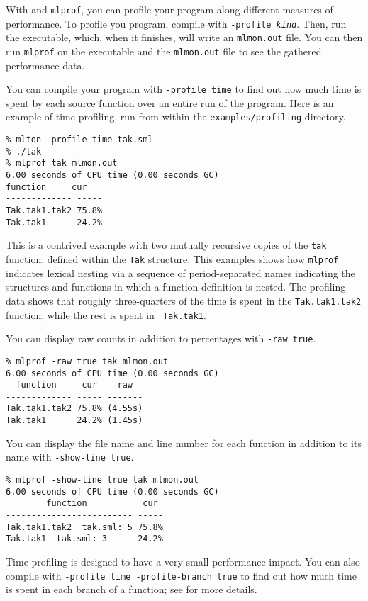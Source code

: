 
With {\mlton} and {\tt mlprof}, you can profile your program along
different measures of performance.  To profile you program, compile
with {\tt -profile {\em kind}}.  Then, run the executable, which, when
it finishes, will write an {\tt mlmon.out} file.  You can then run
{\tt mlprof} on the executable and the {\tt mlmon.out} file to see the
gathered performance data.

%
You can compile your program with {\tt -profile time} to find out how
much time is spent by each source function over an entire run of the
program.  Here is an example of time profiling, run from within the
{\tt examples/profiling} directory.
\begin{verbatim}
% mlton -profile time tak.sml
% ./tak
% mlprof tak mlmon.out
6.00 seconds of CPU time (0.00 seconds GC)
function     cur 
------------- -----
Tak.tak1.tak2 75.8%
Tak.tak1      24.2%
\end{verbatim}
This is a contrived example with two mutually recursive copies of the
{\tt tak} function, defined within the {\tt Tak} structure.  This
examples shows how {\tt mlprof} indicates lexical nesting via a
sequence of period-separated names indicating the structures and
functions in which a function definition is nested.  The profiling
data shows that roughly three-quarters of the time is spent in the
{\tt Tak.tak1.tak2} function, while the rest is spent in {\tt
Tak.tak1}.

You can display raw counts in addition to percentages with {\tt -raw
true}.
\begin{verbatim}
% mlprof -raw true tak mlmon.out
6.00 seconds of CPU time (0.00 seconds GC)
  function     cur    raw  
------------- ----- -------
Tak.tak1.tak2 75.8% (4.55s)
Tak.tak1      24.2% (1.45s)
\end{verbatim}
%
You can display the file name and line number for each function in
addition to its name with {\tt -show-line true}.
\begin{verbatim}
% mlprof -show-line true tak mlmon.out
6.00 seconds of CPU time (0.00 seconds GC)
        function           cur 
------------------------- -----
Tak.tak1.tak2  tak.sml: 5 75.8%
Tak.tak1  tak.sml: 3      24.2%
\end{verbatim}

Time profiling is designed to have a very small performance impact.
You can also compile with {\tt -profile time -profile-branch true} to
find out how much time is spent in each branch of a function; see
 for more details.

